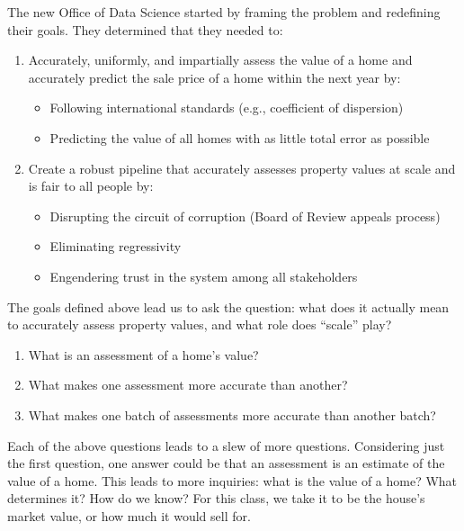 \documentclass[
  letterpaper,
  DIV=11,
  numbers=noendperiod]{scrreprt}
\providecommand{\tightlist}{%
  \setlength{\itemsep}{0pt}\setlength{\parskip}{0pt}}\usepackage{longtable,booktabs,array}
\begin{document}
The new Office of Data Science started by framing the problem and
redefining their goals. They determined that they needed to:

\begin{enumerate}
\def\labelenumi{\arabic{enumi}.}
\tightlist
\item
  Accurately, uniformly, and impartially assess the value of a home and
  accurately predict the sale price of a home within the next year by:

  \begin{itemize}
  \tightlist
  \item
    Following international standards (e.g., coefficient of dispersion)
  \item
    Predicting the value of all homes with as little total error as
    possible
  \end{itemize}
\item
  Create a robust pipeline that accurately assesses property values at
  scale and is fair to all people by:

  \begin{itemize}
  \tightlist
  \item
    Disrupting the circuit of corruption (Board of Review appeals
    process)
  \item
    Eliminating regressivity
  \item
    Engendering trust in the system among all stakeholders
  \end{itemize}
\end{enumerate}

The goals defined above lead us to ask the question: what does it
actually mean to accurately assess property values, and what role does
``scale'' play?

\begin{enumerate}
\def\labelenumi{\arabic{enumi}.}
\tightlist
\item
  What is an assessment of a home's value?
\item
  What makes one assessment more accurate than another?
\item
  What makes one batch of assessments more accurate than another batch?
\end{enumerate}

Each of the above questions leads to a slew of more questions.
Considering just the first question, one answer could be that an
assessment is an estimate of the value of a home. This leads to more
inquiries: what is the value of a home? What determines it? How do we
know? For this class, we take it to be the house's market value, or how
much it would sell for.
\end{document}
